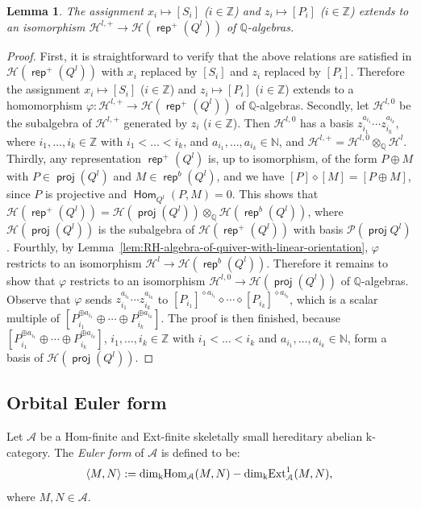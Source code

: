 \documentclass[reqno,12pt,a4paper]{amsart}
\newtheorem{lemma}[theorem]{Lemma}
\theoremstyle{remark}
\theoremstyle{definition}
\newcommand{\opname}[1]{\operatorname{\mathsf{#1}}}
\newcommand{\proj}{\opname{proj}\nolimits}
\newcommand{\rep}{\opname{rep}\nolimits}
\newcommand{\Hom}{\opname{Hom}}
\newcommand{\ten}{\otimes}
\newcommand{\ca}{{\mathcal A}}
\newcommand{\ch}{{\mathcal H}}
\newcommand{\cp}{{\mathcal P}}
\newcommand{\fk}{{\mathrm k}}
\numberwithin{equation}{section}
\begin{document}
\begin{lemma}
	\label{lem:RH-algebra-of-quiver-with-linear-orientation-$+$}
	The assignment $x_i\mapsto [S_i]$ ($i\in\mathbb{Z}$) and $z_i\mapsto [P_i]$ ($i\in\mathbb{Z}$) extends to an isomorphism $\ch^{l,+}\to\ch(\rep^+(Q^l))$ of $\mathbb{Q}$-algebras.
\end{lemma}
\begin{proof}
First, it is straightforward to verify that the above relations are satisfied in $\ch(\rep^+(Q^l))$ with $x_i$ replaced by $[S_i]$ and $z_i$ replaced by $[P_i]$. Therefore the assignment $x_i\mapsto [S_i]$ ($i\in\mathbb{Z}$) and $z_i\mapsto [P_i]$ ($i\in\mathbb{Z}$) extends to a homomorphism $\varphi\colon\ch^{l,+}\to\ch(\rep^+(Q^l))$ of $\mathbb{Q}$-algebras. Secondly, let $\mathcal{H}^{l,0}$ be the subalgebra of $\mathcal{H}^{l,+}$ generated by $z_i$ ($i\in\mathbb{Z}$). Then $\ch^{l,0}$ has a basis $z_{i_1}^{a_{i_1}}\cdots z_{i_k}^{a_{i_k}}$, where $i_1,\ldots,i_k\in\mathbb{Z}$ with $i_1<\ldots<i_k$, and $a_{i_1},\ldots,a_{i_k}\in\mathbb{N}$, and $\ch^{l,+}=\ch^{l,0}\ten_{\mathbb{Q}}\ch^l$.  Thirdly, any representation $\rep^+(Q^l)$ is, up to isomorphism, of the form $P\oplus M$ with $P\in \proj(Q^l)$ and $M\in\rep^b(Q^l)$, and we have $[P]\diamond[M]=[P\oplus M]$, since $P$ is projective and $\Hom_{Q^l}(P,M)=0$. This shows that $\ch(\rep^+(Q^l))=\ch(\proj(Q^l))\ten_{\mathbb{Q}}\ch(\rep^b(Q^l))$, where $\ch(\proj(Q^l))$ is the subalgebra of $\ch(\rep^+(Q^l))$ with basis $\cp(\proj Q^l)$. Fourthly, by Lemma~\ref{lem:RH-algebra-of-quiver-with-linear-orientation}, $\varphi$ restricts to an isomorphism $\ch^l\to\ch(\rep^b(Q^l))$. Therefore it remains to show that $\varphi$ restricts to an isomorphism $\ch^{l,0}\to\ch(\proj(Q^l))$ of $\mathbb{Q}$-algebras. Observe that $\varphi$ sends $z_{i_1}^{a_{i_1}}\cdots z_{i_k}^{a_{i_k}}$ to $[P_{i_1}]^{\diamond a_{i_1}}\diamond\cdots\diamond [P_{i_k}]^{\diamond a_{i_k}}$, which is a scalar multiple of $[P_{i_1}^{\oplus a_{i_1}}\oplus\cdots \oplus P_{i_k}^{\oplus a_{i_k}}]$. The proof is then finished, because $[P_{i_1}^{\oplus a_{i_1}}\oplus\cdots \oplus P_{i_k}^{\oplus a_{i_k}}]$, $i_1,\ldots,i_k\in\mathbb{Z}$ with $i_1<\ldots<i_k$ and $a_{i_1},\ldots,a_{i_k}\in\mathbb{N}$, form a basis of $\ch(\proj(Q^l))$. 
\end{proof}



\subsection{Orbital Euler form}\label{ss:orbit-Euler-form}
Let $\mathcal{A}$ be a Hom-finite and Ext-finite skeletally small hereditary abelian $\fk$-category. The \emph{Euler form} of $\ca$ is defined to be:
\[\langle M,N\rangle:={\rm dim}_{\fk}{\rm Hom}_{\mathcal{A}}(M,N)-{\rm dim}_{\fk}{\rm Ext}^1_{\mathcal{A}}(M,N),\]
where $M,N\in \mathcal{A}$.
\end{document}
